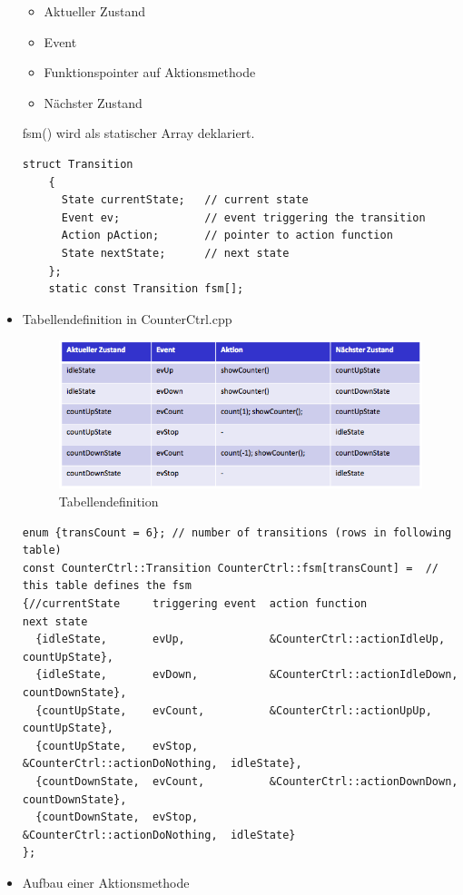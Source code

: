 \begin{itemize}
\begin{itemize}
   \item Aktueller Zustand
   \item Event
   \item Funktionspointer auf Aktionsmethode
   \item Nächster Zustand
 \end{itemize}
fsm() wird als statischer Array deklariert.
\begin{lstlisting}[style=Cpp]
struct Transition
    {
      State currentState;   // current state
      Event ev;             // event triggering the transition
      Action pAction;       // pointer to action function
      State nextState;      // next state
    };
    static const Transition fsm[];
\end{lstlisting}

\item Tabellendefinition in CounterCtrl.cpp
\begin{figure}[h]
  \centering
  {\includegraphics[scale = 0.5]{images/FSM/tabelle}  
  \caption{Tabellendefinition}
  \label{fig:tabelle}}
\end{figure}
\begin{lstlisting}[style=Cpp]
enum {transCount = 6}; // number of transitions (rows in following table)
const CounterCtrl::Transition CounterCtrl::fsm[transCount] =  // this table defines the fsm
{//currentState     triggering event  action function                 next state
  {idleState,       evUp,             &CounterCtrl::actionIdleUp,     countUpState},
  {idleState,       evDown,           &CounterCtrl::actionIdleDown,   countDownState},
  {countUpState,    evCount,          &CounterCtrl::actionUpUp,       countUpState},
  {countUpState,    evStop,           &CounterCtrl::actionDoNothing,  idleState},
  {countDownState,  evCount,          &CounterCtrl::actionDownDown,   countDownState},
  {countDownState,  evStop,           &CounterCtrl::actionDoNothing,  idleState}
};
\end{lstlisting}
\item Aufbau einer Aktionsmethode

\end{itemize}
